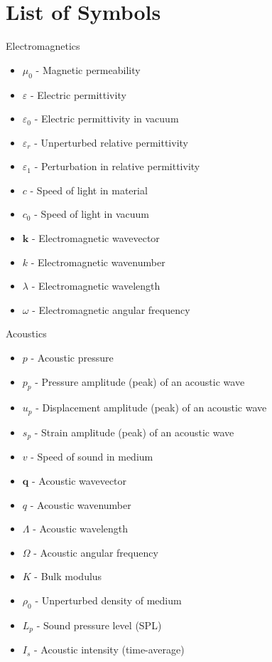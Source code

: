 \documentclass[11pt,twoside]{eitExjobb}
\begin{document}
	\chapter*{List of Symbols}
		Electromagnetics
		\begin{itemize}
			\item $\mu_0$ - Magnetic permeability
			\item $\varepsilon$ - Electric permittivity
			\item $\varepsilon_0$ - Electric permittivity in vacuum
			\item $\varepsilon_r$ - Unperturbed relative permittivity
			\item $\varepsilon_1$ - Perturbation in relative permittivity
			\item $c$ - Speed of light in material
			\item $c_0$ - Speed of light in vacuum
			\item $\bm{k}$ - Electromagnetic wavevector
			\item $k$ - Electromagnetic wavenumber
			\item $\lambda$ - Electromagnetic wavelength
			\item $\omega$ - Electromagnetic angular frequency
		\end{itemize}
		Acoustics
		\begin{itemize}
			\item $p$ - Acoustic pressure
			\item $p_p$ - Pressure amplitude (peak) of an acoustic wave
			\item $u_p$ - Displacement amplitude (peak) of an acoustic wave
			\item $s_p$ - Strain amplitude (peak) of an acoustic wave
			\item $v$ - Speed of sound in medium
			\item $\bm{q}$ - Acoustic wavevector
			\item $q$ - Acoustic wavenumber
			\item $\Lambda$ - Acoustic wavelength
			\item $\Omega$ - Acoustic angular frequency
			\item $K$ - Bulk modulus
			\item $\rho_0$ - Unperturbed density of medium
			\item $L_p$ - Sound pressure level (SPL)
			\item $I_s$ - Acoustic intensity (time-average)
		\end{itemize}
\end{document}
